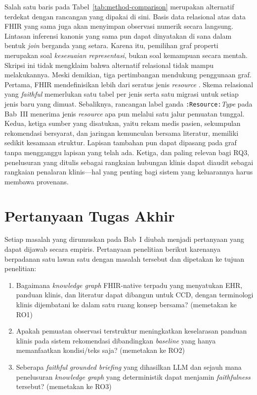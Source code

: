 Salah satu baris pada Tabel~\ref{tab:method-comparison} merupakan
alternatif terdekat dengan rancangan yang dipakai di sini. Basis data relasional atas data FHIR yang sama juga akan menyimpan observasi numerik secara
langsung. Lintasan inferensi kanonis yang sama pun dapat dinyatakan di sana dalam bentuk
\emph{join} berganda yang setara. Karena itu, pemilihan graf properti merupakan soal
\emph{kesesuaian representasi}, bukan soal kemampuan secara mentah. Skripsi ini tidak
mengklaim bahwa alternatif relasional tidak mampu melakukannya. Meski
demikian, tiga pertimbangan mendukung penggunaan graf. Pertama, FHIR mendefinisikan lebih dari seratus jenis \emph{resource} \cite{fhir_r4}. Skema
relasional yang \emph{faithful} memerlukan satu tabel per jenis serta satu migrasi untuk
setiap jenis baru yang dimuat. Sebaliknya, rancangan label ganda
\texttt{:Resource:}\textit{Type} pada Bab~III menerima jenis \emph{resource} apa pun melalui
satu jalur pemuatan tunggal. Kedua, ketiga sumber yang disatukan, yaitu rekam medis pasien,
sekumpulan rekomendasi bersyarat, dan jaringan kemunculan bersama literatur, memiliki
sedikit kesamaan struktur. Lapisan tambahan pun dapat dipasang pada graf tanpa mengganggu
lapisan yang telah ada. Ketiga, dan paling relevan bagi RQ3, penelusuran yang ditulis sebagai rangkaian
hubungan klinis dapat diaudit sebagai rangkaian penalaran klinis---hal yang penting bagi sistem
yang keluarannya harus membawa provenans.

\section{Pertanyaan Tugas Akhir}

Setiap masalah yang dirumuskan pada Bab~I diubah menjadi pertanyaan yang dapat dijawab
secara empiris. Pertanyaan penelitian berikut karenanya berpadanan satu lawan satu dengan
masalah tersebut dan dipetakan ke tujuan penelitian:

\begin{enumerate}
    \item[RQ1.] Bagaimana \emph{knowledge graph} FHIR-native terpadu yang menyatukan EHR,
    panduan klinis, dan literatur dapat dibangun untuk CCD, dengan terminologi klinis dijembatani ke
    dalam satu ruang konsep bersama? (memetakan ke RO1)
    \item[RQ2.] Apakah pemuatan observasi terstruktur meningkatkan keselarasan panduan klinis pada
    sistem rekomendasi dibandingkan \emph{baseline} yang hanya memanfaatkan
    kondisi/teks saja? (memetakan ke RO2)
    \item[RQ3.] Seberapa \emph{faithful} \emph{grounded briefing} yang dihasilkan LLM dan
    sejauh mana penelusuran \emph{knowledge graph} yang deterministik dapat menjamin
    \emph{faithfulness} tersebut? (memetakan ke RO3)
\end{enumerate}
